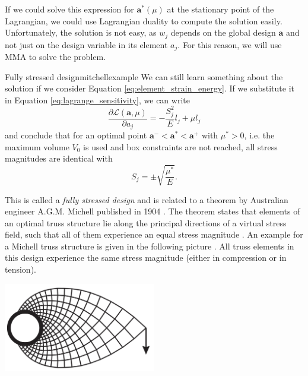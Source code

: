 If we could solve this expression for $\mathbf{a}^*(\mu)$ at the stationary point of the Lagrangian, we could use Lagrangian duality to compute the solution easily. Unfortunately, the solution is not easy, as $w_j$ depends on the global design $\mathbf{a}$ and not just on the design variable in its element $a_j$. For this reason, we will use MMA to solve the problem.

\begin{example}{Fully stressed design}{mitchellexample}
    We can still learn something about the solution if we consider Equation \eqref{eq:element_strain_energy}. If we substitute it in Equation \eqref{eq:lagrange_sensitivity}, we can write 
    \begin{equation}
        \frac{\partial \mathcal{L} (\mathbf{a}, \mu)}{\partial a_j} = - \frac{S^2_j}{E} l_j + \mu l_j
    \end{equation}
    and conclude that for an optimal point $\mathbf{a}^- < \mathbf{a}^* < \mathbf{a}^+$ with $\mu^*>0$, i.e. the maximum volume $V_0$ is used and box constraints are not reached, all stress magnitudes are identical with
    \begin{equation}
        S_j = \pm \sqrt{\frac{\mu^*}{E}}.
    \end{equation}
    
    This is called a \emph{fully stressed design} and is related to a theorem by Australian engineer A.G.M. Michell published in 1904 \cite{Michell1904}. The theorem states that elements of an optimal truss structure lie along the principal directions of a virtual stress field, such that all of them experience an equal stress magnitude \cite{Arora2019}.
    An example for a Michell truss structure is given in the following picture \cite{Picelli2015}. All truss elements in this design experience the same stress magnitude (either in compression or in tension).
    \begin{center}
        \includegraphics[width=0.5\textwidth]{figures/michell.png}
    \end{center}
    
\end{example}

